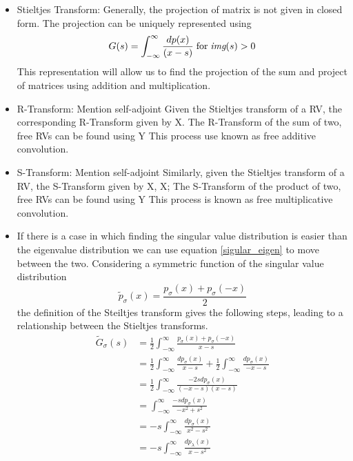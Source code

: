 \documentclass[12pt,a4paper]{report}
\begin{document}
\begin{itemize}
\begin{itemize}
	 	\item 
	 	Stieltjes Transform: 
	 	Generally, the projection of matrix is not given in closed form. The projection can be uniquely represented using
		\begin{equation}\label{stieltjes}
		G(s) = \int_{-\infty}^{\infty} \frac{dp(x)}{(x - s)} \; \text{for} \; \textit{img}(s) > 0
		\end{equation}	
		This representation will allow us to find the projection of the sum and project of matrices using addition and multiplication.
		\item 
		R-Transform:
		Mention self-adjoint
		Given the Stieltjes transform of a RV, the corresponding R-Transform given by 
		X. 
		The R-Transform of the sum of two, free RVs can be found using
		Y
		This process use known as free additive convolution.
		\item
		S-Transform:
		Mention self-adjoint
		Similarly, given the Stieltjes transform of a RV, the S-Transform given by 
		X, X;
		The S-Transform of the product of two, free RVs can be found using
		Y
		This process is known as free multiplicative convolution.
	 	\item 
	 	If there is a case in which finding the singular value distribution is easier than the eigenvalue distribution we can use equation  
	 	 \eqref{sigular_eigen} to move between the two. Considering a symmetric function of the singular value distribution
	 	 \begin{equation}\label{symmetric}
	 	 \tilde{p}_{\sigma}(x) = \frac{p_{\sigma}(x) + p_{\sigma}(-x)}{2}
	 	 \end{equation}
	 	 the definition of the Steiltjes transform gives the following steps, leading to a relationship between the Stieltjes transforms. 
	 	 \begin{align*}
	 	 \tilde{G}_\sigma (s) & =  \frac{1}{2} \int_{-\infty}^{\infty} \frac{p_{\sigma}(x) + p_{\sigma}(-x)}{x-s}
	 	 \\&  =  
	 	 \frac{1}{2} \int_{-\infty}^{\infty} \frac{dp_{\sigma}(x)}{x - s} + 
	 	 \frac{1}{2} \int_{-\infty}^{\infty} \frac{dp_{\sigma}(x)}{-x - s}
	 	 \\&  =  
	 	 	 	 \frac{1}{2} \int_{-\infty}^{\infty} \frac{-2s dp_{\sigma}(x)}{(-x - s)(x - s)}
	  	 \\&  =  
	 	 	 	\int_{-\infty}^{\infty} \frac{-s dp_{\sigma}(x)}{-x^2 + s^2} 	
 	 	  	 \\&  =  
 	 	 	-s  \int_{-\infty}^{\infty}  \frac{dp_{\sigma}(x)}{ x^2 - s^2} 	 
 	 	 \\&  =  
			-s  \int_{-\infty}^{\infty}  \frac{dp_{\lambda}(x)}{ x - s^2} 

\end{align*}
\end{itemize}
\end{itemize}
\end{document}
